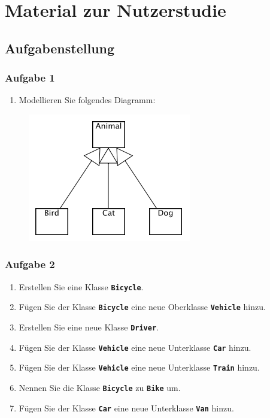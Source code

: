 
\chapter{Material zur Nutzerstudie}

\section{Aufgabenstellung}

\subsection*{Aufgabe 1}

\begin{enumerate}
    \item Modellieren Sie folgendes Diagramm:
\end{enumerate}

\begin{figure}[hbt]
    \includegraphics[scale=0.9]{../user-study-exercises/resources/exercise-1}
\end{figure}

\subsection*{Aufgabe 2}
\begin{enumerate}
    \item Erstellen Sie eine Klasse \texttt{\textbf{Bicycle}}.
    \item Fügen Sie der Klasse \texttt{\textbf{Bicycle}} eine neue Oberklasse \texttt{\textbf{Vehicle}} hinzu.
    \item Erstellen Sie eine neue Klasse \texttt{\textbf{Driver}}.
    \item Fügen Sie der Klasse \texttt{\textbf{Vehicle}} eine neue Unterklasse \texttt{\textbf{Car}} hinzu.
    \item Fügen Sie der Klasse \texttt{\textbf{Vehicle}} eine neue Unterklasse \texttt{\textbf{Train}} hinzu.
    \item Nennen Sie die Klasse \texttt{\textbf{Bicycle}} zu \texttt{\textbf{Bike}} um.
    \item Fügen Sie der Klasse \texttt{\textbf{Car}} eine neue Unterklasse \texttt{\textbf{Van}} hinzu.
\end{enumerate}

